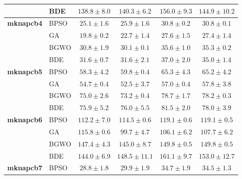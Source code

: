 \begin{table}[htbp]
\begin{tabular*}{\textwidth}{@{\extracolsep{\fill}}llcccc@{}}
                       & BDE   & $\mathbf{138.8 \pm 8.0}$ &          $140.3 \pm 6.2$ &          $156.0 \pm 9.3$ &         $144.9 \pm 10.2$ \\
    \midrule
    \textbf{mknapcb4}  & BPSO  &  $\mathbf{25.1 \pm 1.6}$ &           $25.9 \pm 1.6$ &           $30.8 \pm 0.2$ &           $30.8 \pm 0.1$ \\
                       & GA    &  $\mathbf{19.8 \pm 0.2}$ &           $22.7 \pm 1.4$ &           $27.6 \pm 1.5$ &           $27.4 \pm 1.4$ \\
                       & BGWO  &           $30.8 \pm 1.9$ &  $\mathbf{30.1 \pm 0.1}$ &           $35.6 \pm 1.0$ &           $35.3 \pm 0.2$ \\
                       & BDE   &  $\mathbf{31.6 \pm 0.7}$ &           $31.6 \pm 2.1$ &           $37.0 \pm 2.0$ &           $35.0 \pm 1.4$ \\
    \midrule
    \textbf{mknapcb5}  & BPSO  &  $\mathbf{58.3 \pm 4.2}$ &           $59.8 \pm 0.4$ &           $65.3 \pm 4.3$ &           $65.2 \pm 4.2$ \\
                       & GA    &           $54.7 \pm 0.4$ &  $\mathbf{52.5 \pm 3.7}$ &           $57.0 \pm 0.4$ &           $57.8 \pm 3.8$ \\
                       & BGWO  &           $75.0 \pm 2.6$ &  $\mathbf{73.2 \pm 0.4}$ &           $78.7 \pm 1.7$ &           $78.2 \pm 0.3$ \\
                       & BDE   &  $\mathbf{75.9 \pm 5.2}$ &           $76.0 \pm 5.5$ &           $81.5 \pm 2.0$ &           $78.0 \pm 3.9$ \\
    \midrule
    \textbf{mknapcb6}  & BPSO  & $\mathbf{112.2 \pm 7.0}$ &          $114.5 \pm 0.6$ &          $119.1 \pm 0.6$ &          $119.1 \pm 0.5$ \\
                       & GA    &          $115.8 \pm 0.6$ &  $\mathbf{99.7 \pm 4.7}$ &          $106.1 \pm 6.2$ &          $107.7 \pm 6.2$ \\
                       & BGWO  &          $147.4 \pm 4.3$ & $\mathbf{145.0 \pm 8.7}$ &          $149.8 \pm 0.5$ &          $149.8 \pm 0.5$ \\
                       & BDE   & $\mathbf{144.0 \pm 6.9}$ &         $148.5 \pm 11.1$ &          $161.1 \pm 9.7$ &         $153.0 \pm 12.7$ \\
    \midrule
    \textbf{mknapcb7}  & BPSO  &  $\mathbf{28.8 \pm 1.8}$ &           $29.9 \pm 1.9$ &           $34.7 \pm 1.9$ &           $34.5 \pm 1.3$ \\

\end{tabular*}
\end{table}

